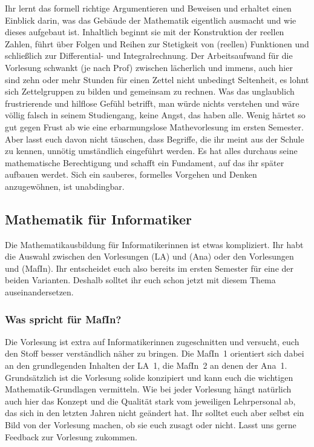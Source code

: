 Ihr lernt das formell richtige Argumentieren und Beweisen und erhaltet einen Einblick darin, was das Gebäude der Mathematik eigentlich ausmacht und wie dieses aufgebaut ist. Inhaltlich beginnt sie mit der Konstruktion der reellen Zahlen, führt über Folgen und Reihen zur Stetigkeit von (reellen) Funktionen und schließlich zur Differential- und Integralrechnung. Der Arbeitsaufwand für die Vorlesung schwankt (je nach Prof) zwischen lächerlich und immens, auch hier sind zehn oder mehr Stunden für einen Zettel nicht unbedingt Seltenheit, es lohnt sich Zettelgruppen zu bilden und gemeinsam zu rechnen. Was das unglaublich frustrierende und hilflose Gefühl betrifft, man würde nichts verstehen und wäre völlig falsch in seinem Studiengang, keine Angst, das haben alle. Wenig härtet so gut gegen Frust ab wie eine erbarmungslose Mathevorlesung im ersten Semester. Aber lasst euch davon nicht täuschen, dass Begriffe, die ihr meint aus der Schule zu kennen, unnötig umständlich eingeführt werden. Es hat alles durchaus seine mathematische Berechtigung und schafft ein Fundament, auf das ihr später aufbauen werdet. Sich ein sauberes, formelles Vorgehen und Denken anzugewöhnen, ist unabdingbar.

\vspace{-2mm}
\subsection{Mathematik für Informatiker}
\label{mafin}
Die Mathematikausbildung für Informatikerinnen ist etwas kompliziert. Ihr habt die Auswahl zwischen den Vorlesungen  (\gls{LA}) und  (\gls{Ana}) oder den Vorlesungen  und  (\gls{MafIn}). Ihr entscheidet euch also bereits im ersten Semester für eine der beiden Varianten. Deshalb solltet ihr euch schon jetzt mit diesem Thema auseinandersetzen.

\vspace{-2mm}

\subsubsection{Was spricht für MafIn?}

Die Vorlesung ist extra auf Informatikerinnen zugeschnitten und versucht, euch den Stoff besser verständlich näher zu bringen. Die \gls{MafIn}~1 orientiert sich dabei an den grundlegenden Inhalten der \gls{LA}~1, die \gls{MafIn}~2 an denen der \gls{Ana}~1. Grundsätzlich ist die Vorlesung solide konzipiert und kann euch die wichtigen Mathematik-Grundlagen vermitteln. Wie bei jeder Vorlesung hängt natürlich auch hier das Konzept und die Qualität stark vom jeweiligen Lehrpersonal ab, das sich in den letzten Jahren nicht geändert hat. Ihr solltet euch aber selbst ein Bild von der Vorlesung machen, ob sie euch zusagt oder nicht. Lasst uns gerne Feedback zur Vorlesung zukommen.

